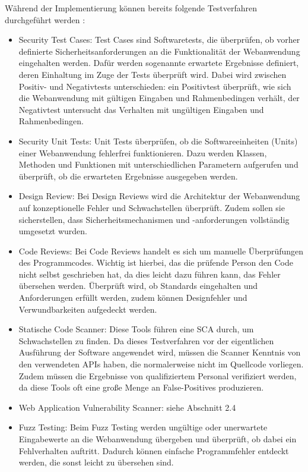 \documentclass[12pt,oneside,a4paper,parskip,pointlessnumbers]{scrbook}
\begin{document}
  Während der Implementierung können bereits folgende Testverfahren durchgeführt werden \cite{BSI}:
  \begin{itemize}
    \item Security Test Cases:
    Test Cases sind Softwaretests, die überprüfen, ob vorher definierte Sicherheitsanforderungen an die Funktionalität der Webanwendung eingehalten werden. Dafür werden sogenannte erwartete Ergebnisse definiert, deren Einhaltung im Zuge der Tests überprüft wird. Dabei wird zwischen Positiv- und Negativtests unterschieden: ein Positivtest überprüft, wie sich die Webanwendung mit gültigen Eingaben und Rahmenbedingen verhält, der Negativtest untersucht das Verhalten mit ungültigen Eingaben und Rahmenbedingen.
    \item Security Unit Tests:
    Unit Tests überprüfen, ob die Softwareeinheiten (Units) einer Webanwendung fehlerfrei funktionieren. Dazu werden Klassen, Methoden und Funktionen mit unterschiedlichen Parametern aufgerufen und überprüft, ob die erwarteten Ergebnisse ausgegeben werden.
    \item Design Review:
    Bei Design Reviews wird die Architektur der Webanwendung auf konzeptionelle Fehler und Schwachstellen überprüft. Zudem sollen sie sicherstellen, dass Sicherheitsmechanismen und -anforderungen vollständig umgesetzt wurden.
    \item Code Reviews:
    Bei Code Reviews handelt es sich um manuelle Überprüfungen des Programmcodes. Wichtig ist hierbei, das die prüfende Person den Code nicht selbst geschrieben hat, da dies leicht dazu führen kann, das Fehler übersehen werden. Überprüft wird, ob Standards eingehalten und Anforderungen erfüllt werden, zudem können Designfehler und Verwundbarkeiten aufgedeckt werden.
    \item Statische Code Scanner:
    Diese Tools führen eine \ac{SCA} durch, um Schwachstellen zu finden. Da dieses Testverfahren vor der eigentlichen Ausführung der Software angewendet wird, müssen die Scanner Kenntnis von den verwendeten APIs haben, die normalerweise nicht im Quellcode vorliegen. Zudem müssen die Ergebnisse von qualifiziertem Personal verifiziert werden, da diese Tools oft eine große Menge an False-Positives produzieren.
    \item Web Application Vulnerability Scanner: siehe Abschnitt 2.4
    \item Fuzz Testing:
    Beim Fuzz Testing werden ungültige oder unerwartete Eingabewerte an die Webanwendung übergeben und überprüft, ob dabei ein Fehlverhalten auftritt. Dadurch können einfache Programmfehler entdeckt werden, die sonst leicht zu übersehen sind. \cite{BSI}
  \end{itemize}
\end{document}
